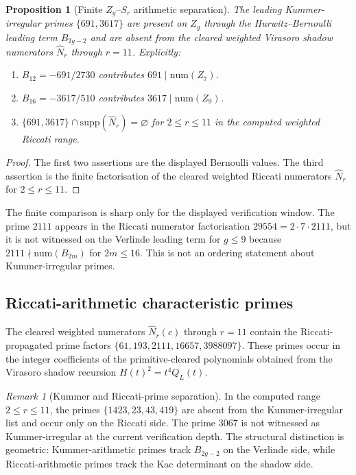 \documentclass[11pt,reqno]{amsart}
\newtheorem{proposition}[theorem]{Proposition}
\theoremstyle{definition}
\theoremstyle{remark}
\newtheorem{remark}[theorem]{Remark}
\numberwithin{equation}{section}
\begin{document}
\begin{proposition}[Finite $Z_g$--$S_r$ arithmetic separation]
\label{prop:z-g-s-r-arithmetic-duality-standalone}
The leading Kummer-irregular primes $\{691, 3617\}$ are present on
$Z_g$ through the Hurwitz--Bernoulli leading term $B_{2g-2}$ and are
absent from the cleared weighted Virasoro shadow numerators
$\widehat N_r$ through $r = 11$. Explicitly:
\begin{enumerate}[label=\textup{(\roman*)}]
\item\label{duality-i}
 $B_{12} = -691/2730$ contributes $691 \mid \mathrm{num}(Z_7)$.
\item\label{duality-ii}
 $B_{16} = -3617/510$ contributes
 $3617 \mid \mathrm{num}(Z_9)$.
\item\label{duality-iii}
 $\{691, 3617\}\cap \mathrm{supp}(\widehat N_r)=\varnothing$
 for $2 \le r \le 11$ in the computed weighted Riccati range.
\end{enumerate}
\end{proposition}

\begin{proof}
The first two assertions are the displayed Bernoulli values. The
third assertion is the finite factorisation of the cleared weighted
Riccati numerators $\widehat N_r$ for $2\le r\le 11$.
\end{proof}

The finite comparison is sharp only for the displayed verification
window. The prime $2111$ appears in the Riccati numerator
factorisation $29554 = 2 \cdot 7 \cdot 2111$, but it is not
witnessed on the Verlinde leading term for $g\le9$ because
$2111\nmid\mathrm{num}(B_{2m})$ for $2m\le16$. This is not an
ordering statement about Kummer-irregular primes.

\subsection{Riccati-arithmetic characteristic primes}

The cleared weighted numerators $\widehat N_r(c)$ through $r=11$
contain the Riccati-propagated prime factors
$\{61,193,2111,16657,3988097\}$. These primes occur in the integer
coefficients of the primitive-cleared polynomials obtained from the
Virasoro shadow recursion $H(t)^2=t^4Q_L(t)$.

\begin{remark}[Kummer and Riccati-prime separation]
\label{rem:kummer-riccati-prime-separation}
In the computed range $2\le r\le 11$, the primes
$\{1423, 23, 43, 419\}$ are absent from the Kummer-irregular list
and occur only on the Riccati side. The prime $3067$ is not witnessed
as Kummer-irregular at the current verification depth. The structural
distinction is geometric: Kummer-arithmetic primes track $B_{2g-2}$
on the Verlinde side, while Riccati-arithmetic primes track the Kac
determinant on the shadow side.
\end{remark}
\end{document}
